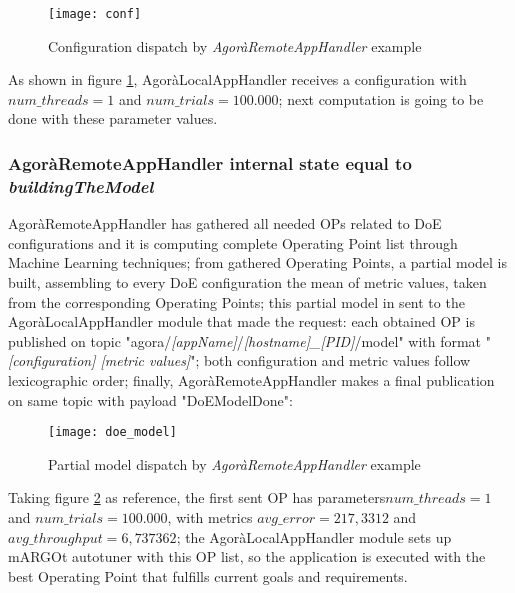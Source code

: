 \begin{figure}[H]

    \centering
    \texttt{[image: conf]}
    \caption{Configuration dispatch by \textit{AgoràRemoteAppHandler} example}
    \label{fig:conf}
    
\end{figure}

As shown in figure \ref{fig:conf}, AgoràLocalAppHandler receives a configuration with $num\_threads = 1$ and $num\_trials = 100.000$; next computation is going to be done with these parameter values.


\subsubsection{AgoràRemoteAppHandler internal state equal to \textit{building\-The\-Model}}\label{DoEModelSend}

AgoràRemoteAppHandler has gathered all needed OPs related to DoE configurations and it is computing complete Operating Point list through Machine Learning techniques; from gathered Operating Points, a partial model is built, assembling to every DoE configuration the mean of metric values, taken from the corresponding Operating Points; this partial model in sent to the AgoràLocalAppHandler module that made the request: each obtained OP is published on topic "agora/\textit{[appName]}/\textit{[hostname]\_[PID]}/model" with format "\textit{[configuration] [metric values]}"; both configuration and metric values follow lexicographic order; finally, AgoràRemoteAppHandler makes a final publication on same topic with payload "DoEModelDone":

\begin{figure}[H]

    \centering
    \texttt{[image: doe\_model]}
    \caption{Partial model dispatch by \textit{AgoràRemoteAppHandler} example}
    \label{fig:doe_model}
    
\end{figure}

Taking figure \ref{fig:doe_model} as reference, the first sent OP has parameters\linebreak $num\_threads = 1$ and $num\_trials = 100.000$, with metrics $avg\_error = 217,3312$ and $avg\_throughput = 6,737362$; the AgoràLocalAppHandler module sets up mARGOt autotuner with this OP list, so the application is executed with the best Operating Point that fulfills current goals and requirements.


